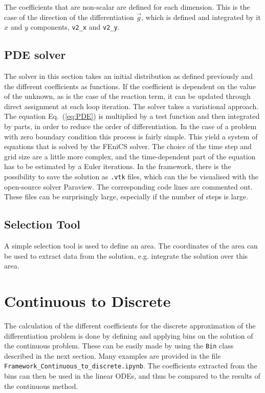 \documentclass[11pt,oneside]{article}   	%
\newcommand{\fenics}{FEniCS\xspace}
\renewcommand{\eqref}[1]{Eq.~(\ref{#1})}
\begin{document}
The coefficients that are non-scalar are defined for each dimension.
This is the case of the direction of the differentiation $\vec{g}$, which is defined and integrated by it $x$ and $y$ components, \texttt{v2\_x} and \texttt{v2\_y}.

\subsection{PDE solver}
The solver in this section takes an initial distribution as defined previously and the different coefficients as functions.
If the coefficient is dependent on the value of the unknown, as is the case of the reaction term, it can be updated through direct assignment at each loop iteration. 
The solver takes a variational approach.
The equation \eqref{eq:PDE} is multiplied by a test function and then integrated by parts, in order to reduce the order of differentiation.
In the case of a problem with zero boundary condition this process is fairly simple.
This yield a system of equations that is solved by the \fenics solver.
The choice of the time step and grid size are a little more complex, and the time-dependent part of the equation has to be estimated by a Euler iterations.
In the framework, there is the possibility to save the solution as \texttt{.vtk} files, which can the be visualised with the open-source solver Paraview.
The corresponding code lines are commented out.
These files can be surprisingly large, especially if the number of steps is large.
 
\subsection{Selection Tool}
A simple selection tool is used to define an area.
The coordinates of the area can be used to extract data from the solution, e.g. integrate the solution over this area. 


\section{Continuous to Discrete}
The calculation of the different coefficients for the discrete approximation of the differentiation problem is done by defining and applying bins on the solution of the continuous problem.
These can be easily made by using the \texttt{Bin} class described in the next section.
Many examples are provided in the file \texttt{Framework\_Continuous\_to\_discrete.ipynb}.
The coefficients extracted from the bins can then be used in the linear ODEs, and thus be compared to the results of the continuous method.
\end{document}
